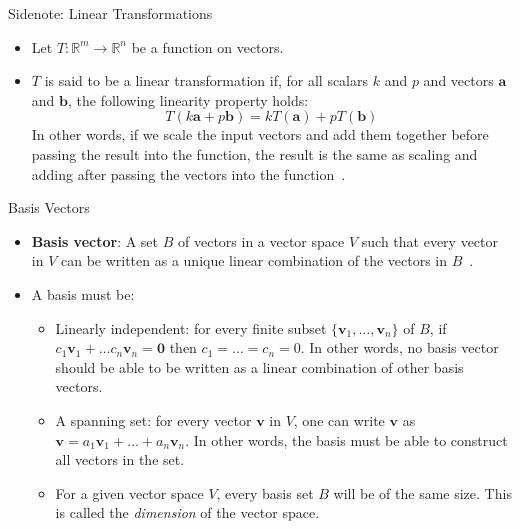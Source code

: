 \documentclass[aspectratio=169,xcolor=dvipsnames]{beamer}
\begin{document}


\begin{frame}{Sidenote: Linear Transformations}
      \begin{itemize}
            \item Let $T : \mathbb{R}^m \to \mathbb{R}^n$ be a function on vectors.
            \item $T$ is said to be a linear transformation if, for all scalars $k$ and $p$
                  and vectors $\mathbf{a}$ and $\mathbf{b}$, the following linearity
                  property holds:
                  $$T(k\mathbf{a} + p\mathbf{b}) = kT(\mathbf{a}) + pT(\mathbf{b})$$
                  In other words, if we scale the input vectors and add them together before
                  passing the result into the function, the result is the same as
                  scaling and adding after passing the vectors into the function~{\color{red}\cite{kuttler_first_2008}}.
      \end{itemize}
\end{frame}


\begin{frame}{Basis Vectors}
      \begin{itemize}
            \item \textbf{Basis vector}: A set $B$ of vectors in a vector space $V$ such that every 
            vector in $V$ can be written as a unique linear combination of the vectors 
            in $B$~\cite{Wikipedia_Basis_2025}.
            \item A basis must be:
            \begin{itemize}
                  \item Linearly independent: for every finite subset $\{\mathbf{v}_1,\ldots,\mathbf{v}_n\}$
                        of $B$, if $c_1\mathbf{v}_1+\ldots c_n\mathbf{v}_n = \mathbf{0}$ then
                        $c_1=\ldots= c_n = 0$. In other words, no basis vector should be able to
                        be written as a linear combination of other basis vectors.
                  \item A spanning set: for every vector $\mathbf{v}$ in $V$, one can
                        write $\mathbf{v}$ as $\mathbf{v} = a_1\mathbf{v}_1+\ldots+a_n\mathbf{v}_n$.
                        In other words, the basis must be able to construct all vectors in the set.
                  \item For a given vector space $V$, every basis set $B$ will be of the same size.
                        This is called the \textit{dimension} of the vector space.
            \end{itemize}
      \end{itemize}
\end{frame}
\end{document}

